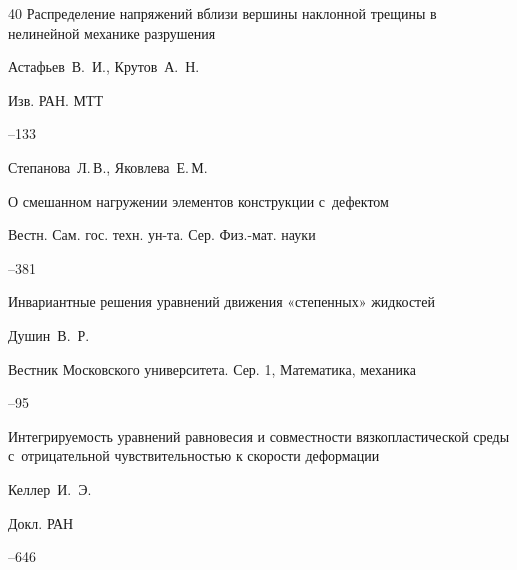 \begin{thebibliography}{40}
\paper Распределение напряжений вблизи вершины наклонной трещины в нелинейной механике разрушения

\by    Астафьев~В.~И., Крутов~А.~Н.

\jour Изв. РАН. МТТ



--133

	


\by    Степанова~Л.\,В., Яковлева~Е.\,М.

\paper О смешанном нагружении элементов конструкции с~дефектом

\jour  Вестн. Сам. гос. техн. ун-та. Сер. Физ.-мат. науки




--381







\paper Инвариантные решения уравнений движения «степенных» жидкостей

\by    Душин~В.~Р.

\jour Вестник Московского университета. Сер. 1, Математика, механика



--95




\paper Интегрируемость уравнений равновесия и совместности вязкопластической среды с~отрицательной чувствительностью к скорости деформации

\by    Келлер~И.~Э.

\jour Докл. РАН




--646



\end{thebibliography}

\RuDate









